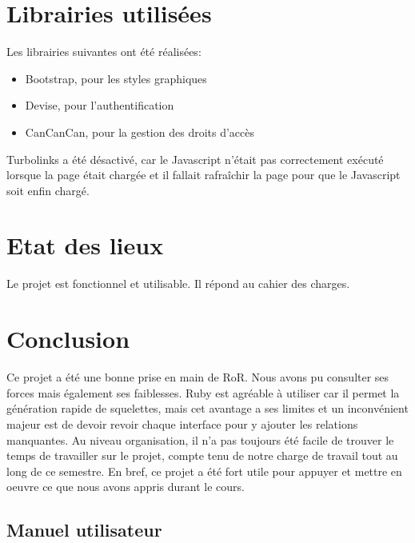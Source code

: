\documentclass{article}
\begin{document}
\section{Librairies utilisées}

Les librairies suivantes ont été réalisées:

\begin{itemize}
\item Bootstrap, pour les styles graphiques
\item Devise, pour l'authentification
\item CanCanCan, pour la gestion des droits d'accès
\end{itemize}

\par\null\par

Turbolinks a été désactivé, car le Javascript n'était pas correctement exécuté lorsque la page était chargée et il fallait rafraîchir la page pour que le Javascript soit enfin chargé.

\section{Etat des lieux}

Le projet est fonctionnel et utilisable. Il répond au cahier des charges.

\newpage
\section{Conclusion}

Ce projet a été une bonne prise en main de RoR. Nous avons pu consulter ses forces mais également ses faiblesses. Ruby est agréable à utiliser car il permet la génération rapide de squelettes, mais cet avantage a ses limites et un inconvénient majeur est de devoir revoir chaque interface pour y ajouter les relations manquantes. Au niveau organisation, il n'a pas toujours été facile de trouver le temps de travailler sur le projet, compte tenu de notre charge de travail tout au long de ce semestre. En bref, ce projet a été fort utile pour appuyer et mettre en oeuvre ce que nous avons appris durant le cours.

\printbibliography

\newpage
\begin{appendices}

\newpage
\section{Manuel utilisateur}
\end{appendices}
\end{document}
